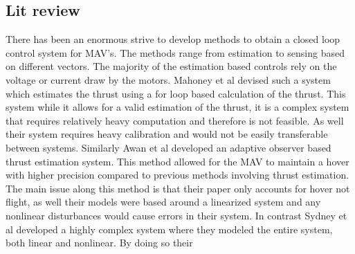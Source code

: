 \documentclass[conference]{IEEEtran}
\begin{document}
	\subsection{Lit review}
	There has been an enormous strive to develop methods to obtain a closed loop control system for MAV's. The methods range from estimation to sensing based on different vectors. The majority of the estimation based controls rely on the voltage or current draw by the motors. Mahoney et al \cite{Mahoney1} devised such a system which estimates the thrust using a for loop based calculation of the thrust. This system while it allows for a valid estimation of the thrust, it is a complex system that requires relatively heavy computation and therefore is not feasible. As well their system requires heavy calibration and would not be easily transferable between systems. Similarly Awan et al \cite{awan} developed an adaptive observer based thrust estimation system. This method allowed for the MAV to maintain a hover with higher precision compared to previous methods involving thrust estimation. The main issue along this method is that their paper only accounts for hover not flight, as well their models were based around a linearized system and any nonlinear disturbances would cause errors in their system. In contrast Sydney et al \cite{sydney} developed a highly complex system where they modeled the entire system, both linear and nonlinear. By doing so their 	
	
\end{document}
